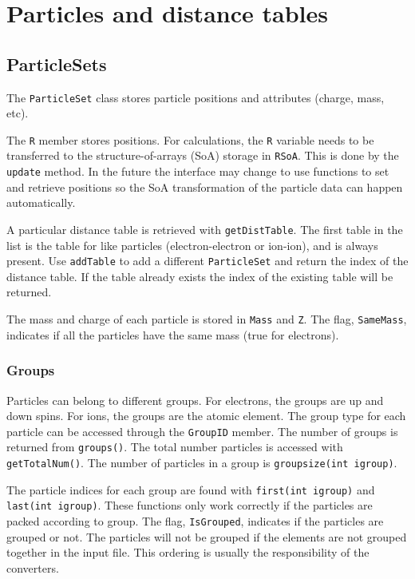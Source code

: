 \section{Particles and distance tables}
\label{sec:distance_tables}

\subsection{ParticleSets}
The \texttt{ParticleSet} class stores particle positions and attributes (charge, mass, etc).

The \texttt{R} member stores positions.
For calculations, the \texttt{R} variable needs to be transferred to the structure-of-arrays (SoA) storage in \texttt{RSoA}.   This is done by the \texttt{update} method.
In the future the interface may change to use functions to set and retrieve positions
so the SoA transformation of the particle data can happen automatically.

A particular distance table is retrieved with \texttt{getDistTable}.
The first table in the list is the table for like particles (electron-electron or ion-ion), and is always present.
Use \texttt{addTable} to add a different \texttt{ParticleSet} and return the index of the distance table.
If the table already exists the index of the existing table will be returned.

The mass and charge of each particle is stored in \texttt{Mass} and \texttt{Z}.
The flag, \texttt{SameMass}, indicates if all the particles have the same mass (true for electrons).

\subsubsection{Groups}

Particles can belong to different groups.
For electrons, the groups are up and down spins.
For ions, the groups are the atomic element.
The group type for each particle can be accessed through the \texttt{GroupID} member.
The number of groups is returned from \texttt{groups()}.
The total number particles is accessed with \texttt{getTotalNum()}.
The number of particles in a group is \texttt{groupsize(int igroup)}.

The particle indices for each group are found with \texttt{first(int igroup)} and \texttt{last(int igroup)}.
These functions only work correctly if the particles are packed according to group.
The flag, \texttt{IsGrouped}, indicates if the particles are grouped or not.
The particles will not be grouped if the elements are not grouped together in the input file.
This ordering is usually the responsibility of the converters.

